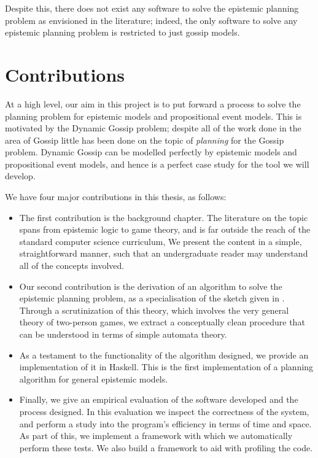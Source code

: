 \documentclass[10pt, a4paper]{report}
\begin{document}
Despite this, there does not exist any software to solve the epistemic planning
problem as envisioned in the literature; indeed, the only software to solve any
epistemic planning problem is restricted to just gossip models.

\section{Contributions}

At a high level, our aim in this project is to put forward a process to solve
the planning problem for epistemic models and propositional event models. This
is motivated by the Dynamic Gossip problem; despite all of the work done in the
area of Gossip little has been done on the topic of \emph{planning} for the
Gossip problem. Dynamic Gossip can be modelled perfectly by epistemic models and
propositional event models, and hence is a perfect case study for the tool we
will develop. 

We have four major contributions in this thesis, as follows:

\begin{itemize}
\item The first contribution is the background chapter. The literature on the
  topic spans from epistemic logic to game theory, and is far outside the reach
  of the standard computer science curriculum, We present the content in a
  simple, straightforward manner, such that an undergraduate reader may
  understand all of the concepts involved.
\item Our second contribution is the derivation of an algorithm to solve the
  epistemic planning problem, as a specialisation of the sketch given in
  \cite{AutomataTechniques}. Through a scrutinization of this theory, which
  involves the very general theory of two-person games, we extract a
  conceptually clean procedure that can be understood in terms of simple
  automata theory.
\item As a testament to the functionality of the algorithm designed, we provide
  an implementation of it in Haskell. This is the first implementation of a
  planning algorithm for general epistemic models. 
\item Finally, we give an empirical evaluation of the software developed and the
  process designed. In this evaluation we inspect the correctness of the system,
  and perform a study into the program's efficiency in terms of time and space.
  As part of this, we implement a framework with which we automatically perform
  these tests. We also build a framework to aid with profiling the code.
\end{itemize}
\end{document}
